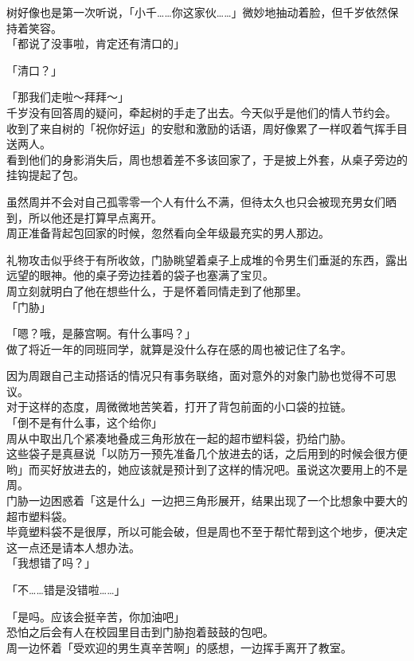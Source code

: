 树好像也是第一次听说，「小千……你这家伙……」微妙地抽动着脸，但千岁依然保持着笑容。\\

「都说了没事啦，肯定还有清口的」

「清口？」

「那我们走啦～拜拜～」\\

千岁没有回答周的疑问，牵起树的手走了出去。今天似乎是他们的情人节约会。\\

收到了来自树的「祝你好运」的安慰和激励的话语，周好像累了一样叹着气挥手目送两人。\\

看到他们的身影消失后，周也想着差不多该回家了，于是披上外套，从桌子旁边的挂钩提起了包。

虽然周并不会对自己孤零零一个人有什么不满，但待太久也只会被现充男女们晒到，所以他还是打算早点离开。\\

周正准备背起包回家的时候，忽然看向全年级最充实的男人那边。

礼物攻击似乎终于有所收敛，门胁眺望着桌子上成堆的令男生们垂涎的东西，露出远望的眼神。他的桌子旁边挂着的袋子也塞满了宝贝。\\

周立刻就明白了他在想些什么，于是怀着同情走到了他那里。\\

「门胁」

「嗯？哦，是藤宫啊。有什么事吗？」\\

做了将近一年的同班同学，就算是没什么存在感的周也被记住了名字。

因为周跟自己主动搭话的情况只有事务联络，面对意外的对象门胁也觉得不可思议。\\

对于这样的态度，周微微地苦笑着，打开了背包前面的小口袋的拉链。\\

「倒不是有什么事，这个给你」\\

周从中取出几个紧凑地叠成三角形放在一起的超市塑料袋，扔给门胁。\\

这些袋子是真昼说「以防万一预先准备几个放进去的话，之后用到的时候会很方便哟」而买好放进去的，她应该就是预计到了这样的情况吧。虽说这次要用上的不是周。\\

门胁一边困惑着「这是什么」一边把三角形展开，结果出现了一个比想象中要大的超市塑料袋。\\

毕竟塑料袋不是很厚，所以可能会破，但是周也不至于帮忙帮到这个地步，便决定这一点还是请本人想办法。\\

「我想错了吗？」

「不……错是没错啦……」

「是吗。应该会挺辛苦，你加油吧」\\

恐怕之后会有人在校园里目击到门胁抱着鼓鼓的包吧。\\

周一边怀着「受欢迎的男生真辛苦啊」的感想，一边挥手离开了教室。
